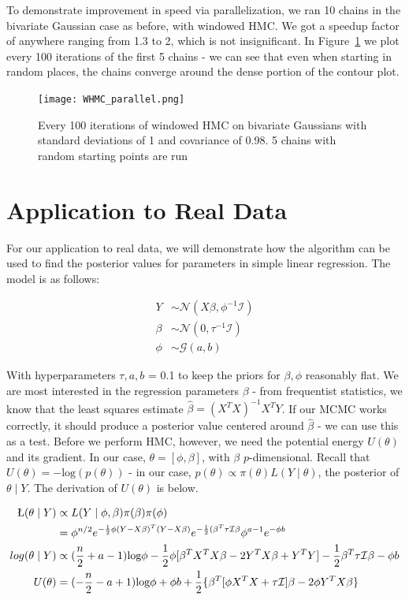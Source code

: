 \documentclass{article}
\numberwithin{equation}{section}
\begin{document}
To demonstrate improvement in speed via parallelization, we ran 10 chains in the bivariate Gaussian case as before, with windowed HMC. We got a speedup factor of anywhere ranging from 1.3 to 2, which is not insignificant. In Figure~\ref{parallel} we plot every 100 iterations of the first 5 chains - we can see that even when starting in random places, the chains converge around the dense portion of the contour plot.

\begin{figure}[H]
\centering
  \texttt{[image: WHMC\_parallel.png]}
  \caption{Every 100 iterations of windowed HMC on bivariate Gaussians with standard deviations of 1 and covariance of 0.98.  5 chains with random starting points are run}
\label{parallel}
\end{figure}


\section{Application to Real Data}
For our application to real data, we will demonstrate how the algorithm can be used to find the posterior values for parameters in simple linear regression. The model is as follows:

\begin{align*}
Y&\sim \mathcal{N}(X\beta, \phi^{-1}\mathcal{I})\\
\beta&\sim \mathcal{N}(0,\tau^{-1}\mathcal{I})\\
\phi&\sim \mathcal{G}(a,b)
\end{align*}

With hyperparameters $\tau,a,b$ = 0.1 to keep the priors for $\beta, \phi$ reasonably flat. We are most interested in the regression parameters $\beta$ - from frequentist statistics, we know that the least squares estimate $\hat{\beta} = (X^TX)^{-1}X^TY$. If our MCMC works correctly, it should produce a posterior value centered around $\hat{\beta}$ - we can use this as a test. Before we perform HMC, however, we need the potential energy $U(\theta)$ and its gradient. In our case, $\theta = [\phi, \beta]$, with $\beta$ $p$-dimensional. Recall that $U(\theta) = -\text{log}(p(\theta))$ - in our case, $p(\theta) \propto \pi(\theta)L(Y\mid\theta)$, the posterior of $\theta\mid Y$. The derivation of $U(\theta)$ is below.

\begin{align*}
\L(\theta\mid Y) &\propto L(Y\mid \phi,\beta)\pi(\beta)\pi(\phi)\\
&= \phi^{n/2}e^{-\frac{1}{2}\phi(Y-X\beta)^T(Y-X\beta)}e^{-\frac{1}{2}(\beta^T\tau\mathcal{I}\beta}\phi^{a-1}e^{-\phi b}\\
log(\theta\mid Y) &\propto (\frac{n}{2} + a - 1)\text{log}\phi - \frac{1}{2}\phi[\beta^TX^TX\beta - 2Y^TX\beta + Y^TY] - \frac{1}{2}\beta^T\tau\mathcal{I}\beta - \phi b\\
U(\theta) &= (-\frac{n}{2} - a + 1)\text{log}\phi + \phi b + \frac{1}{2}\{\beta^T[\phi X^TX + \tau\mathcal{I}]\beta - 2\phi Y^TX\beta\}
\end{align*}
\end{document}

